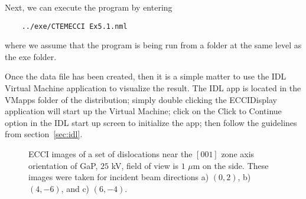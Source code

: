 \documentclass[DIV=calc, paper=letter, fontsize=11pt]{scrartcl}	 %
\begin{document}
Next, we can execute the program by entering
\begin{verbatim}
	../exe/CTEMECCI Ex5.1.nml
\end{verbatim}
where we assume that the program is being run from a folder at the same level as the exe folder.  


Once the data file has been created, then it is a simple matter to use the IDL Virtual Machine application to 
visualize the result.   The IDL app is located in the VMapps folder of the distribution; simply double clicking the \textsf{ECCIDisplay}
application will start up the Virtual Machine; click on the \textsf{Click to Continue} option in the IDL start up screen to 
initialize the app; then follow the guidelines from section~\ref{sec:idl}.

\begin{figure}[h]
\leavevmode\centering
\epsfxsize=6in
\caption{\label{fig:ECCIdislo}ECCI images of a set of dislocations near the $[001]$ zone axis orientation of GaP, $25$ kV, field of view is 
$1$ $\mu$m on the side.  These images were taken for incident beam directions a) $(0,2)$, b) $(4,-6)$, and c) $(6,-4)$.}
\end{figure}

\newcommand{\disloc}[6]{$\frac{1}{2}[#1\,#2\,#3]\vert [#4\,#5\,#6]$}
\end{document}
